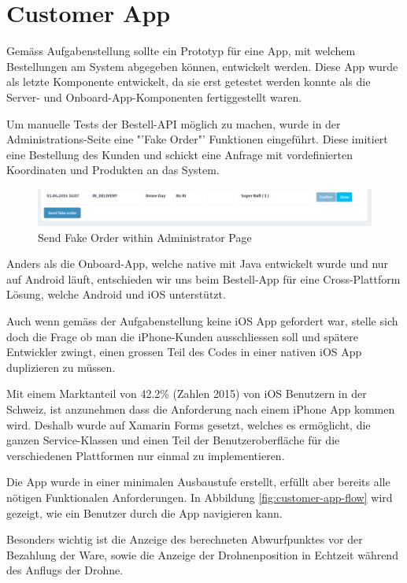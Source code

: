 \section{Customer App}
Gemäss Aufgabenstellung sollte ein Prototyp für eine App, mit welchem Bestellungen am System abgegeben können, entwickelt werden.
Diese App wurde als letzte Komponente entwickelt, da sie erst getestet werden konnte als die Server- und Onboard-App-Komponenten fertiggestellt waren.

Um manuelle Tests der Bestell-API möglich zu machen, wurde in der Administrations-Seite eine "'Fake Order"' Funktionen eingeführt. 
Diese imitiert eine Bestellung des Kunden und schickt eine Anfrage mit vordefinierten Koordinaten und Produkten an das System.

\begin{figure}[h]
	\centering
	\includegraphics[width=1\textwidth] {images/customer-app-fake-order.png}
	\caption{Send Fake Order within Administrator Page}
\end{figure}

Anders als die Onboard-App, welche native mit Java entwickelt wurde und nur auf Android läuft, entschieden wir uns beim Bestell-App für eine Cross-Plattform Lösung, welche Android und iOS unterstützt. 

Auch wenn gemäss der Aufgabenstellung keine iOS App gefordert war, stelle sich doch die Frage ob man die iPhone-Kunden ausschliessen soll und spätere Entwickler zwingt, einen grossen Teil des Codes in einer nativen iOS App duplizieren zu müssen.

Mit einem Marktanteil von 42.2\% (Zahlen 2015) \cite{ios-user} von iOS Benutzern in der Schweiz, ist anzunehmen dass die Anforderung nach einem iPhone App kommen wird. Deshalb wurde auf Xamarin Forms gesetzt, welches es ermöglicht, die ganzen Service-Klassen und einen Teil der Benutzeroberfläche für die verschiedenen Plattformen nur einmal zu implementieren.

Die App wurde in einer minimalen Ausbaustufe erstellt, erfüllt aber bereits alle nötigen Funktionalen Anforderungen. In Abbildung \ref{fig:customer-app-flow} wird gezeigt, wie ein Benutzer durch die App navigieren kann. 

Besonders wichtig ist die Anzeige des berechneten Abwurfpunktes vor der Bezahlung der Ware, sowie die Anzeige der Drohnenposition in Echtzeit während des Anflugs der Drohne.  

